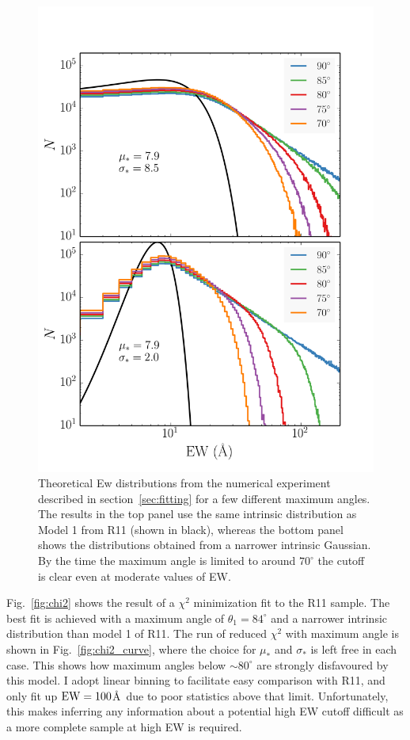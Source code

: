 \begin{figure}
\centering
\includegraphics[width=1.0\textwidth]{figures/ewpaper/cutoff.png}
\caption
{
Theoretical Ew distributions from the numerical experiment 
described in section~\ref{sec:fitting} for a few different 
maximum angles. The results in the top panel use the same intrinsic
distribution as Model 1 from R11 (shown in black), 
whereas the bottom panel shows the distributions 
obtained from a narrower intrinsic Gaussian. By the time the maximum
angle is limited to around $70^\circ$ the cutoff is
clear even at moderate values of EW.
}
\label{fig:cutoff}
\end{figure}

Fig.~\ref{fig:chi2} shows the result of a $\chi^2$ minimization fit 
to the R11 sample. The best fit is achieved with a maximum angle of 
$\theta_{1}=84^\circ$ and a narrower intrinsic distribution
than model 1 of R11. The run of reduced $\chi^2$ with maximum angle
is shown in Fig.~\ref{fig:chi2_curve}, where the choice for $\mu_*$
and $\sigma_*$ is left free in each case. This shows
how maximum angles below $\sim80^\circ$ are strongly disfavoured
by this model. I adopt linear binning to facilitate easy comparison 
with R11, and only fit up ${\rm EW}=100$\AA\
due to poor statistics above that limit. Unfortunately, this 
makes inferring any information about a potential high EW cutoff 
difficult as a more complete sample at high EW is required. 

